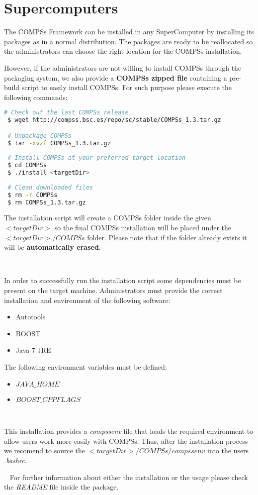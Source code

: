 \section{Supercomputers}
\label{sec:Supercomputers}

The COMPSs Framework can be installed in any SuperComputer by installing its packages as in a normal distribution. The packages are
ready to be reallocated so the administrators can choose the right location for the COMPSs installation. \newline

However, if the administrators are not willing to install COMPSs through the packaging system, we also provide a \textbf{COMPSs zipped file} containing
a pre-build script to easily install COMPSs. For such purpose please execute the following commands:
\begin{lstlisting}[language=bash]
 # Check out the last COMPSs release
 $ wget http://compss.bsc.es/repo/sc/stable/COMPSs_1.3.tar.gz

 # Unpackage COMPSs
 $ tar -xvzf COMPSs_1.3.tar.gz
 
 # Install COMPSs at your preferred target location
 $ cd COMPSs
 $ ./install <targetDir>
 
 # Clean downloaded files
 $ rm -r COMPSs
 $ rm COMPSs_1.3.tar.gz
\end{lstlisting}

The installation script will create a COMPSs folder inside the given $<targetDir>$ so the final COMPSs installation will be placed 
under the $<targetDir>/COMPSs$ folder. Please note that if the folder already exists it will be \textbf{automatically erased}.

~ \newline

In order to successfully run the installation script some dependencies must be present on the target machine. Administrators must provide the correct
installation and environment of the following software:
\begin{itemize}
 \item Autotools
 \item BOOST
 \item Java 7 JRE
\end{itemize}

The following environment variables must be defined:
\begin{itemize}
 \item $JAVA\_HOME$
 \item $BOOST\_CPPFLAGS$
\end{itemize}

~ \newline

This installation provides a \textit{compssenv} file that loads the required environment to allow users work more easily with COMPSs. Thus, after the 
installation process we recomend to source the $<targetDir>/COMPSs/compssenv$ into the users \textit{.bashrc}.


~ \newline
For further information about either the installation or the usage please check the \textit{README} file inside the package. 

